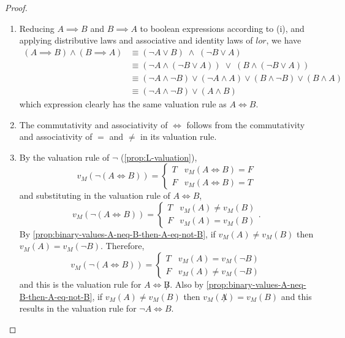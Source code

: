 \documentclass[../MathsNotesBase.tex]{subfiles}
\begin{document}
{\begin{proof}
\begin{enumerate}[label=(\roman*)]
 				\item Reducing ${ A \implies B }$ and ${ B \implies A }$ to boolean expressions according to (i), and applying distributive laws and associative and identity laws of $lor$, we have
 					\[\begin{aligned}
 						(A \implies B) \land (B \implies A) &\equiv (\lnot A \lor B) \; \land \; (\lnot B \lor A)  \\
 						&\equiv (\lnot A \land (\lnot B \lor A)) \; \lor \; (B \land (\lnot B \lor A)) \\
 						&\equiv (\lnot A \land \lnot B) \lor (\lnot A \land A) \lor (B \land \lnot B) \lor (B \land A) \\
 						&\equiv (\lnot A \land \lnot B) \lor (A \land B)
 					\end{aligned}\]
 					which expression clearly has the same valuation rule as ${ A \iff B }$.
 					
 				\nl
 				\item The commutativity and associativity of $\iff$ follows from the commutativity and associativity of $=$ and $\neq$ in its valuation rule.
 				
 				\nl
 				\item By the valuation rule of $\lnot$ (\autoref{prop:L-valuation}),
					\[ v_M( \lnot(A \iff B) ) = \begin{cases}
							 						T & v_M(A \iff B) = F \\
							 						F & v_M(A \iff B) = T
						 						\end{cases}
 					\]
 					and substituting in the valuation rule of $A \iff B$,
 					\[ v_M( \lnot(A \iff B) ) = \begin{cases}
							 						T & v_M(A) \neq v_M(B) \\
							 						F & v_M(A) = v_M(B)
							 					\end{cases}.
 					\]
 					By \autoref{prop:binary-values-A-neq-B-then-A-eq-not-B}, if ${ v_M(A) \neq v_M(B) }$ then ${ v_M(A) = v_M(\lnot B) }$. Therefore,
 					\[ v_M( \lnot(A \iff B) ) = \begin{cases}
							 						T & v_M(A) = v_M(\lnot B) \\
							 						F & v_M(A) \neq v_M(\lnot B)
							 					\end{cases}
 					\]
 					and this is the valuation rule for ${ A \iff \not B }$. Also by \autoref{prop:binary-values-A-neq-B-then-A-eq-not-B}, if ${ v_M(A) \neq v_M(B) }$ then ${ v_M(\not A) = v_M(B) }$ and this results in the valuation rule for ${ \lnot A \iff B }$.
 				

\end{enumerate}
\end{proof}}
\end{document}

